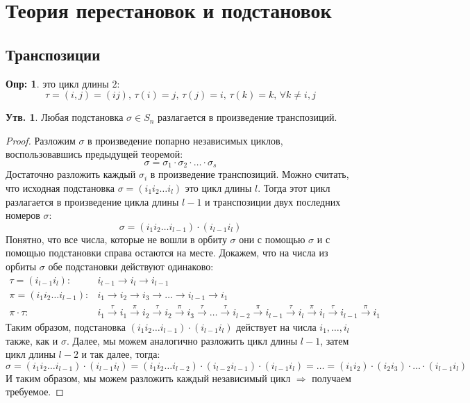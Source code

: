 \documentclass[12pt]{article}
\newcommand{\RN}[1]{%
	\textup{\uppercase\expandafter{\romannumeral#1}}%
}
\theoremstyle{definition}
\newtheorem{defn}{Опр:}
\newtheorem{prop}{Утв.}
\begin{document}
\lhead{Алгебра-\RN{1}}
\section*{Теория перестановок и подстановок}
\subsection*{Транспозиции}

\begin{defn}
	 это цикл длины $2$: 
	$$
		\tau = (i,j) = (ij), \, \tau(i) = j, \, \tau(j) = i, \, \tau(k) = k,\, \forall k \neq i,j
	$$
\end{defn}
\begin{prop}
	Любая подстановка $\sigma \in S_n$ разлагается в произведение транспозиций. 
\end{prop}
\begin{proof}
	Разложим $\sigma$ в произведение попарно независимых циклов, воспользовавшись предыдущей теоремой:
	$$
		\sigma = \sigma_1{\cdot}\sigma_2{\cdot}\dotsc{\cdot}\sigma_s
	$$
	Достаточно разложить каждый $\sigma_i$ в произведение транспозиций. Можно считать, что исходная подстановка $\sigma = (i_1i_2\dotsc i_l)$ это цикл длины $l$. Тогда этот цикл разлагается в произведение цикла длины $l-1$ и транспозиции двух последних номеров $\sigma$:
	$$
		\sigma = (i_1 i_2 \dotsc i_{l-1}){\cdot}(i_{l-1} i_l )
	$$ 
	Понятно, что все числа, которые не вошли в орбиту $\sigma$ они с помощью $\sigma$ и с помощью подстановки справа остаются на месте. Докажем, что на числа из орбиты $\sigma$ обе подстановки действуют одинаково:
	$$
		\begin{array}{rl}
			\tau = (i_{l-1}i_l) \colon & i_{l-1} \to i_l \to i_{l-1} \\ [5pt]
			\pi = (i_1 i_2 \dotsc i_{l-1}) \colon & i_1 \to i_2 \to i_3 \to \dotsc \to i_{l-1} \to i_1\\ [5pt]
			\pi{\cdot}\tau \colon & i_1 \xrightarrow{\tau} i_1 \xrightarrow{\pi} i_2 \xrightarrow{\tau} i_2 \xrightarrow{\pi} i_3 \xrightarrow{\tau} \dotsc \xrightarrow{\tau} i_{l-2} \xrightarrow{\pi} i_{l-1} \xrightarrow{\tau}  i_l \xrightarrow{\pi} i_l \xrightarrow{\tau} i_{l-1} \xrightarrow{\pi} i_1
		\end{array}
	$$
	Таким образом, подстановка $(i_1 i_2 \dotsc i_{l-1}){\cdot}(i_{l-1} i_l )$ действует на числа $i_1,\dotsc, i_l$ также, как и $\sigma$. Далее, мы можем аналогично разложить цикл длины $l-1$, затем цикл длины $l-2$ и так далее, тогда:
	$$
		\sigma = (i_1 i_2 \dotsc i_{l-1}){\cdot}(i_{l-1} i_l ) = (i_1 i_2 \dotsc i_{l-2}){\cdot}(i_{l-2} i_{l-1} ){\cdot}(i_{l-1} i_l ) = \dotsc = (i_1 i_2){\cdot}(i_2 i_3){\cdot}\dotsc{\cdot}(i_{l-1}i_l)
	$$
	И таким образом, мы можем разложить каждый независимый цикл $\Rightarrow$ получаем требуемое.
\end{proof}
\end{document}
